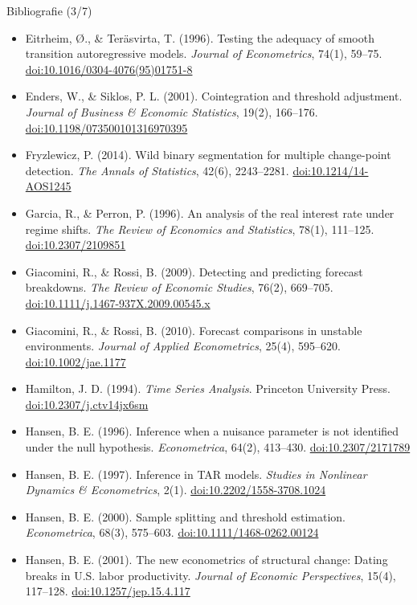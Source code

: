 \begin{frame}{Bibliografie (3/7)}
\itemsize{\tiny}
\begin{itemize}
    \item Eitrheim, Ø., \& Teräsvirta, T. (1996). Testing the adequacy of smooth transition autoregressive models. \textit{Journal of Econometrics}, 74(1), 59--75. \href{https://doi.org/10.1016/0304-4076(95)01751-8}{doi:10.1016/0304-4076(95)01751-8}
    \item Enders, W., \& Siklos, P. L. (2001). Cointegration and threshold adjustment. \textit{Journal of Business \& Economic Statistics}, 19(2), 166--176. \href{https://doi.org/10.1198/073500101316970395}{doi:10.1198/073500101316970395}
    \item Fryzlewicz, P. (2014). Wild binary segmentation for multiple change-point detection. \textit{The Annals of Statistics}, 42(6), 2243--2281. \href{https://doi.org/10.1214/14-AOS1245}{doi:10.1214/14-AOS1245}
    \item Garcia, R., \& Perron, P. (1996). An analysis of the real interest rate under regime shifts. \textit{The Review of Economics and Statistics}, 78(1), 111--125. \href{https://doi.org/10.2307/2109851}{doi:10.2307/2109851}
    \item Giacomini, R., \& Rossi, B. (2009). Detecting and predicting forecast breakdowns. \textit{The Review of Economic Studies}, 76(2), 669--705. \href{https://doi.org/10.1111/j.1467-937X.2009.00545.x}{doi:10.1111/j.1467-937X.2009.00545.x}
    \item Giacomini, R., \& Rossi, B. (2010). Forecast comparisons in unstable environments. \textit{Journal of Applied Econometrics}, 25(4), 595--620. \href{https://doi.org/10.1002/jae.1177}{doi:10.1002/jae.1177}
    \item Hamilton, J. D. (1994). \textit{Time Series Analysis}. Princeton University Press. \href{https://doi.org/10.2307/j.ctv14jx6sm}{doi:10.2307/j.ctv14jx6sm}
    \item Hansen, B. E. (1996). Inference when a nuisance parameter is not identified under the null hypothesis. \textit{Econometrica}, 64(2), 413--430. \href{https://doi.org/10.2307/2171789}{doi:10.2307/2171789}
    \item Hansen, B. E. (1997). Inference in TAR models. \textit{Studies in Nonlinear Dynamics \& Econometrics}, 2(1). \href{https://doi.org/10.2202/1558-3708.1024}{doi:10.2202/1558-3708.1024}
    \item Hansen, B. E. (2000). Sample splitting and threshold estimation. \textit{Econometrica}, 68(3), 575--603. \href{https://doi.org/10.1111/1468-0262.00124}{doi:10.1111/1468-0262.00124}
    \item Hansen, B. E. (2001). The new econometrics of structural change: Dating breaks in U.S. labor productivity. \textit{Journal of Economic Perspectives}, 15(4), 117--128. \href{https://doi.org/10.1257/jep.15.4.117}{doi:10.1257/jep.15.4.117}
\end{itemize}
\end{frame}

